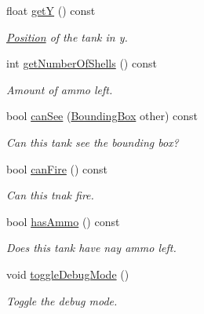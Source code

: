 \begin{DoxyCompactItemize}
\mbox{\label{class_tank_a77c97bf9da4ec98e0659541dfa5305f5}} 
float \mbox{\hyperlink{class_tank_a77c97bf9da4ec98e0659541dfa5305f5}{getY}} () const
\begin{DoxyCompactList}\small\item\em \mbox{\hyperlink{class_position}{Position}} of the tank in y. \end{DoxyCompactList}\item 
\mbox{\label{class_tank_af43b411fce8177c0206fdabb9fd68f51}} 
int \mbox{\hyperlink{class_tank_af43b411fce8177c0206fdabb9fd68f51}{get\+Number\+Of\+Shells}} () const
\begin{DoxyCompactList}\small\item\em Amount of ammo left. \end{DoxyCompactList}\item 
\mbox{\label{class_tank_a597b2c051340cce63e7b5bcb6fa5c39c}} 
bool \mbox{\hyperlink{class_tank_a597b2c051340cce63e7b5bcb6fa5c39c}{can\+See}} (\mbox{\hyperlink{class_bounding_box}{Bounding\+Box}} other) const
\begin{DoxyCompactList}\small\item\em Can this tank see the bounding box? \end{DoxyCompactList}\item 
\mbox{\label{class_tank_a6a39f37aa7ebbf66d0661815c43b37ef}} 
bool \mbox{\hyperlink{class_tank_a6a39f37aa7ebbf66d0661815c43b37ef}{can\+Fire}} () const
\begin{DoxyCompactList}\small\item\em Can this tnak fire. \end{DoxyCompactList}\item 
\mbox{\label{class_tank_a584ef5a0ec4095ca9407fb853677c7f0}} 
bool \mbox{\hyperlink{class_tank_a584ef5a0ec4095ca9407fb853677c7f0}{has\+Ammo}} () const
\begin{DoxyCompactList}\small\item\em Does this tank have nay ammo left. \end{DoxyCompactList}\item 
\mbox{\label{class_tank_a4126dc18c8684e126ba01b45bebc6b62}} 
void \mbox{\hyperlink{class_tank_a4126dc18c8684e126ba01b45bebc6b62}{toggle\+Debug\+Mode}} ()
\begin{DoxyCompactList}\small\item\em Toggle the debug mode. \end{DoxyCompactList}\end{DoxyCompactItemize}

